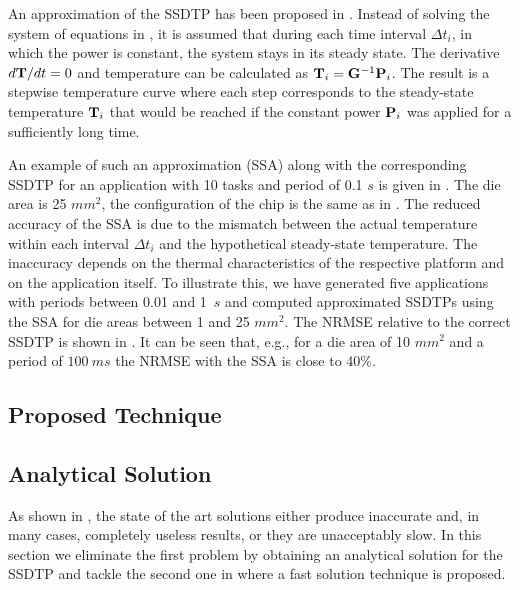 An approximation of the SSDTP has been proposed in \cite{huang2009}. Instead of
solving the system of equations in , it is
assumed that during each time interval $\Delta t_i$, in which the power is
constant, the system stays in its steady state. The derivative $d\mathbf{T}/dt = 0$
and temperature can be calculated as $\mathbf{T}_i = \mathbf{G}^{-1} \mathbf{P}_i$. The result
is a stepwise temperature curve where each step corresponds to the steady-state
temperature $\mathbf{T}_i$ that would be reached if the constant power $\mathbf{P}_i$ was
applied for a sufficiently long time.

An example of such an approximation (SSA) along with the corresponding SSDTP for
an application with 10 tasks and period of 0.1 $s$ is given in
. The die area is 25 $mm^2$, the configuration
of the chip is the same as in . The reduced accuracy of the SSA
is due to the mismatch between the actual temperature within each interval
$\Delta t_i$ and the hypothetical steady-state temperature. The inaccuracy
depends on the thermal characteristics of the respective platform and on the
application itself. To illustrate this, we have generated five applications with
periods between 0.01 and 1~$s$ and computed approximated SSDTPs using the SSA
for die areas between 1 and 25 $mm^2$. The NRMSE relative to the correct SSDTP
is shown in . It can be seen that, e.g., for a die area
of 10 $mm^2$ and a period of $100~ms$ the NRMSE with the SSA is close to 40\%.

\subsection{Proposed Technique}

\subsection{Analytical Solution}

As shown in , the state of the art solutions either
produce inaccurate and, in many cases, completely useless results, or they are
unacceptably slow. In this section we eliminate the first problem by obtaining
an analytical solution for the SSDTP and tackle the second one in
 where a fast solution technique is proposed.

